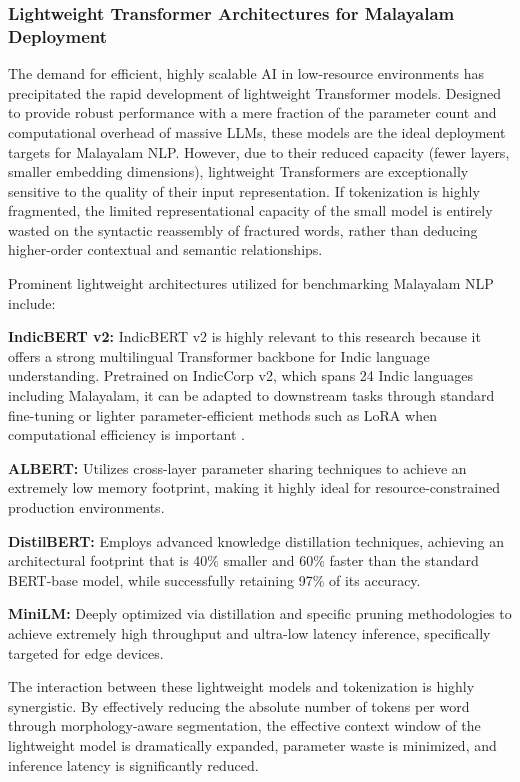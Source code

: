 \documentclass[12pt]{article}
\begin{document}
\subsubsection{Lightweight Transformer Architectures for Malayalam Deployment 
}

The demand for efficient, highly scalable AI in low-resource environments has precipitated the rapid development of lightweight Transformer models. Designed to provide robust performance with a mere fraction of the parameter count and computational overhead of massive LLMs, these models are the ideal deployment targets for Malayalam NLP. However, due to their reduced capacity (fewer layers, smaller embedding dimensions), lightweight Transformers are exceptionally sensitive to the quality of their input representation. If tokenization is highly fragmented, the limited representational capacity of the small model is entirely wasted on the syntactic reassembly of fractured words, rather than deducing higher-order contextual and semantic relationships. 

Prominent lightweight architectures utilized for benchmarking Malayalam NLP include: 

\textbf{IndicBERT v2:} IndicBERT v2 is highly relevant to this research because it offers a strong multilingual Transformer backbone for Indic language understanding. Pretrained on IndicCorp v2, which spans 24 Indic languages including Malayalam, it can be adapted to downstream tasks through standard fine-tuning or lighter parameter-efficient methods such as LoRA when computational efficiency is important \cite{doddapaneni2023indicbertv2,hu2021lora}.

\textbf{ALBERT:} Utilizes cross-layer parameter sharing techniques to achieve an extremely low memory footprint, making it highly ideal for resource-constrained production environments. 

\textbf{DistilBERT:} Employs advanced knowledge distillation techniques, achieving an architectural footprint that is 40\% smaller and 60\% faster than the standard BERT-base model, while successfully retaining 97\% of its accuracy. \cite{sanh2019distilbert}

\textbf{MiniLM:} Deeply optimized via distillation and specific pruning methodologies to achieve extremely high throughput and ultra-low latency inference, specifically targeted for edge devices. 

The interaction between these lightweight models and tokenization is highly synergistic. By effectively reducing the absolute number of tokens per word through morphology-aware segmentation, the effective context window of the lightweight model is dramatically expanded, parameter waste is minimized, and inference latency is significantly reduced. 
\end{document}

